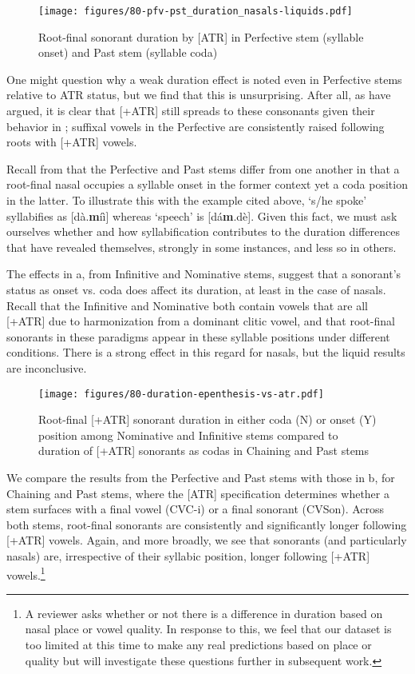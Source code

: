 \documentclass[output=paper,colorlinks,citecolor=brown]{langscibook}
\begin{document}
\begin{figure}
    \centering
    \texttt{[image: figures/80-pfv-pst\_duration\_nasals-liquids.pdf]}    
    \caption{Root-final sonorant duration by [ATR] in Perfective stem (syllable onset) and Past stem (syllable coda)}
    \label{fig:conson-dur-chn-pfv}
\end{figure}

One might question why a weak duration effect is noted even in Perfective stems relative to ATR status, but we find that this is unsurprising. After all, as \citet{GreenHantgan} have argued, it is clear that [+ATR] still spreads to these consonants given their behavior in ; suffixal vowels in the Perfective are consistently raised following roots with [+ATR] vowels.

Recall from  that the Perfective and Past stems differ from one another in that a root-final nasal occupies a syllable onset in the former context yet a coda position in the latter. To illustrate this with the example cited above, `s/he spoke' syllabifies as [dà.\textbf{m}íì] whereas `speech' is [dá\textbf{m}.dè]. Given this fact, we must ask ourselves whether and how syllabification contributes to the duration differences that have revealed themselves, strongly in some instances, and less so in others. 

The effects in a, from Infinitive and Nominative stems, suggest that a sonorant's status as onset vs. coda does affect its duration, at least in the case of nasals. Recall that the Infinitive and Nominative both contain vowels that are all [+ATR] due to harmonization from a dominant clitic  vowel, and that root-final sonorants in these paradigms appear in these syllable positions under different conditions.  There is a strong effect in this regard for nasals, but the liquid results are inconclusive.

\begin{figure}
    \centering
    \texttt{[image: figures/80-duration-epenthesis-vs-atr.pdf]}    
    \caption{Root-final [+ATR] sonorant duration in either coda (N) or onset (Y) position among Nominative and Infinitive stems compared to duration of [+ATR] sonorants as codas in Chaining and Past stems}
    \label{fig:dur-epenth-atr}
\end{figure}

We compare the results from the Perfective and Past stems with those in b, for Chaining and Past stems, where the [ATR] specification determines whether a stem surfaces with a final vowel (CVC-i) or a final sonorant (CVSon). Across both stems, root-final sonorants are consistently and significantly longer following [+ATR] vowels. Again, and more broadly, we see that sonorants (and particularly nasals) are, irrespective of their syllabic position, longer following [+ATR] vowels.\footnote{A reviewer asks whether or not there is a difference in duration based on nasal place or vowel quality. In response to this, we feel that our dataset is too limited at this time to make any real predictions based on place or quality but will investigate these questions further in subsequent work.}
\end{document}
